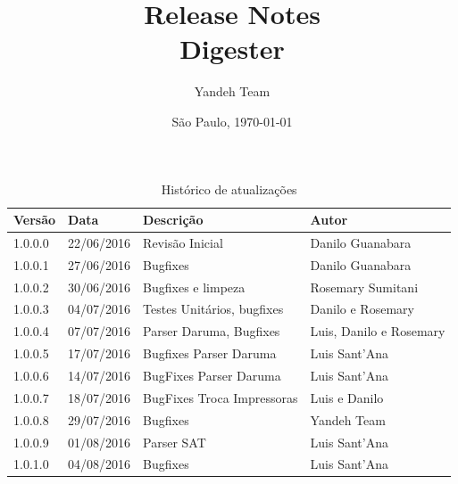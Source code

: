 \documentclass{article}      %
\title{Release Notes \\
      Digester \versiondigester}  %
\author{Yandeh Team}              %
\date{São Paulo, \today}
\begin{document}

\maketitle                   %

\thispagestyle{firststyle}


\begin{table}[!ht]
\centering
\caption{Histórico de atualizações}
\label{my-label}
\begin{tabular}{|l|l|l|l|}
\hline
\textbf{Versão} & \textbf{Data} & \textbf{Descrição}                & \textbf{Autor}                                       \\ \hline
1.0.0.0           & 22/06/2016    & Revisão Inicial                 & Danilo Guanabara                                     \\ \hline
1.0.0.1           & 27/06/2016    & Bugfixes                        & Danilo Guanabara                                     \\ \hline
1.0.0.2           & 30/06/2016    & Bugfixes e limpeza              & Rosemary Sumitani                                    \\ \hline
1.0.0.3           & 04/07/2016    & Testes Unitários, bugfixes      & Danilo e Rosemary                                    \\ \hline
1.0.0.4           & 07/07/2016    & Parser Daruma, Bugfixes         & Luis, Danilo e Rosemary                              \\ \hline
1.0.0.5           & 17/07/2016    & Bugfixes Parser Daruma          & Luis Sant'Ana                                        \\ \hline
1.0.0.6           & 14/07/2016    & BugFixes Parser Daruma          & Luis Sant'Ana                                        \\ \hline  
1.0.0.7           & 18/07/2016    & BugFixes Troca Impressoras      & Luis e Danilo                                        \\ \hline
1.0.0.8           & 29/07/2016    & Bugfixes                        & Yandeh Team                                          \\ \hline
1.0.0.9           & 01/08/2016    & Parser SAT                      & Luis Sant'Ana                                        \\ \hline
1.0.1.0           & 04/08/2016    & Bugfixes                        & Luis Sant'Ana                                        \\ \hline
\end{tabular}
\end{table}
\end{document}
